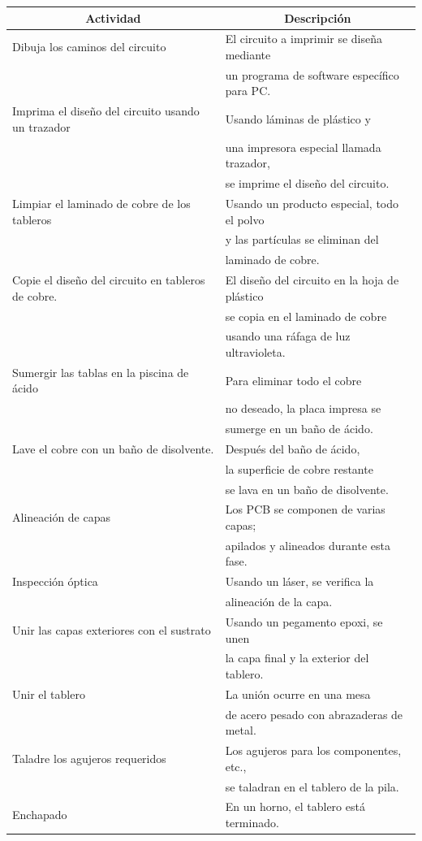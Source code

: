 \documentclass[10pt]{article}
\begin{document}
\begin{tabular}{|l|l|}
\hline
\multicolumn{1}{|c|}{Actividad} & \multicolumn{1}{|c|}{Descripción} \\
\hline
Dibuja los caminos del circuito & El circuito a imprimir se diseña mediante \\ &   un programa de software específico para PC. \\
\hline
Imprima el diseño del circuito usando un trazador & Usando láminas de plástico y \\ & una impresora especial llamada trazador, \\ &  se imprime el diseño del circuito. \\
\hline
Limpiar el laminado de cobre de los tableros & Usando un producto especial, todo el polvo \\ &  y las partículas se eliminan del \\ &  laminado de cobre. \\
\hline
Copie el diseño del circuito en tableros de cobre. & El diseño del circuito en la hoja de plástico \\ &  se copia en el laminado de cobre \\ &  usando una ráfaga de luz
ultravioleta. \\
\hline
Sumergir las tablas en la piscina de ácido & Para eliminar todo el cobre \\ &  no deseado, la placa impresa se \\ & sumerge en un baño de ácido. \\
\hline
Lave el cobre con un baño de disolvente. & Después del baño de ácido, \\ & la superficie de cobre restante \\ &  se lava en un baño de disolvente. \\
\hline
Alineación de capas & Los PCB se componen de varias capas; \\ & apilados y alineados durante esta fase. \\
\hline
Inspección óptica & Usando un láser, se verifica la \\ &  alineación de la capa. \\
\hline
Unir las capas exteriores con el sustrato & Usando un pegamento epoxi, se unen \\ & la capa final y la exterior del tablero. \\
\hline
Unir el tablero & La unión ocurre en una mesa \\ &  de acero pesado con abrazaderas de metal. \\
\hline
Taladre los agujeros requeridos & Los agujeros para los componentes, etc.,\\ &  se taladran en el tablero de la pila.  \\
\hline
Enchapado & En un horno, el tablero está terminado.\\
\hline
\end{tabular}
\newline
\end{document}
